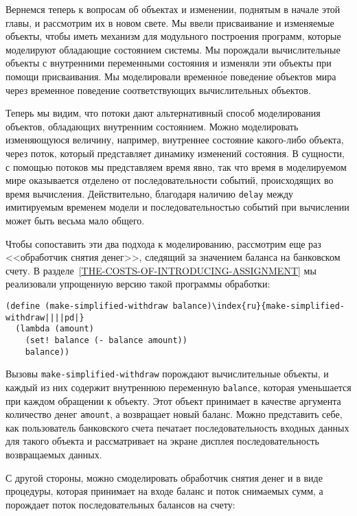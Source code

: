 Вернемся теперь к вопросам об объектах и
изменении, поднятым в начале этой главы, и рассмотрим их в новом
свете.  Мы ввели присваивание и изменяемые объекты, чтобы иметь
механизм для модульного построения программ, которые моделируют обладающие
состоянием системы.  Мы порождали вычислительные объекты с внутренними
переменными состояния и изменяли эти объекты при помощи присваивания.
Мы моделировали временн\'{о}е поведение объектов мира через временное
поведение соответствующих вычислительных объектов.

Теперь мы видим, что потоки дают альтернативный
способ моделирования объектов, обладающих внутренним состоянием.
Можно моделировать изменяющуюся величину, например, внутреннее
состояние какого-либо объекта, через поток, который представляет
динамику изменений состояния.  В сущности, с помощью
потоков мы представляем время явно, так что время в моделируемом мире
оказывается отделено от последовательности событий, происходящих во
время вычисления.  Действительно, благодаря наличию
{\tt delay} между имитируемым временем модели и
последовательностью событий при вычислении может быть весьма
мало общего.

Чтобы сопоставить эти два подхода к моделированию,
рассмотрим еще раз <<обработчик снятия денег>>, следящий за значением
баланса на банковском счету.  В
разделе~\ref{THE-COSTS-OF-INTRODUCING-ASSIGNMENT} мы реализовали
упрощенную версию такой программы обработки:

\begin{Verbatim}[fontsize=\small]
(define (make-simplified-withdraw balance)\index{ru}{make-simplified-withdraw||||pd|}
  (lambda (amount)
    (set! balance (- balance amount))
    balance))
\end{Verbatim}
Вызовы {\tt make-simplified-withdraw} порождают вычислительные
объекты, и каждый из них содержит внутреннюю переменную
{\tt balance}, которая уменьшается при каждом обращении к объекту.
Этот объект принимает в качестве аргумента количество денег
{\tt amount}, а возвращает новый баланс.  Можно представить
себе, как пользователь банковского счета печатает последовательность
входных данных для такого объекта и рассматривает на экране
дисплея последовательность возвращаемых данных.

С другой стороны, можно смоделировать обработчик снятия
денег и в виде  процедуры,
которая принимает на входе баланс и поток
снимаемых сумм, а порождает поток последовательных балансов на счету:

